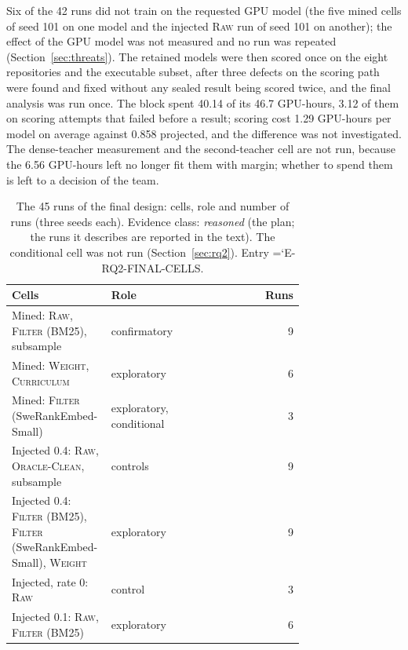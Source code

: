 \documentclass[10pt,twocolumn]{article}
\newcommand{\entry}[1]{{\ttfamily\hyphenchar\font=`\-\relax #1}}
\begin{document}
Six of the 42 runs did not train on the requested GPU model (the five mined cells of seed 101 on one model and the injected \textsc{Raw} run of seed 101 on another); the effect of the GPU model was not measured and no run was repeated (Section~\ref{sec:threats}). %
The retained models were then scored once on the eight repositories and the executable subset, after three defects on the scoring path were found and fixed without any sealed result being scored twice, and the final analysis was run once. %
The block spent 40.14 of its 46.7 GPU-hours, 3.12 of them on scoring attempts that failed before a result; scoring cost 1.29 GPU-hours per model on average against 0.858 projected, and the difference was not investigated.
The dense-teacher measurement and the second-teacher cell are not run, because the 6.56 GPU-hours left no longer fit them with margin; whether to spend them is left to a decision of the team. %

\begin{table}[t]
\centering\small
\caption{The 45 runs of the final design: cells, role and number of runs (three seeds each). Evidence class: \emph{reasoned} (the plan; the runs it describes are reported in the text). The conditional cell was not run (Section~\ref{sec:rq2}). Entry \entry{E-RQ2-FINAL-CELLS}.} %
\label{tab:final_cells}
\begin{tabular}{@{}p{0.34\linewidth}p{0.40\linewidth}r@{}}
\toprule
Cells & Role & Runs \\
\midrule
Mined: \textsc{Raw}, \textsc{Filter} (BM25), subsample & confirmatory & 9 \\ %
Mined: \textsc{Weight}, \textsc{Curriculum} & exploratory & 6 \\ %
Mined: \textsc{Filter} (SweRankEmbed-Small) & exploratory, conditional & 3 \\ %
Injected 0.4: \textsc{Raw}, \textsc{Oracle-Clean}, subsample & controls & 9 \\ %
Injected 0.4: \textsc{Filter} (BM25), \textsc{Filter} (SweRankEmbed-Small), \textsc{Weight} & exploratory & 9 \\ %
Injected, rate 0: \textsc{Raw} & control & 3 \\ %
Injected 0.1: \textsc{Raw}, \textsc{Filter} (BM25) & exploratory & 6 \\ %
\bottomrule
\end{tabular}
\end{table}
\end{document}
